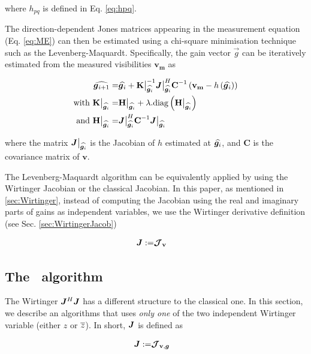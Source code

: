 \noindent where $h_{pq}$ is defined in Eq. \ref{eq:hpq}.

The direction-dependent Jones matrices appearing in the measurement
equation (Eq. \ref{eq:ME}) can then be estimated using a chi-square
minimisation technique such as the Levenberg-Maquardt. Specifically, the gain vector $\vec{g}$ can be iteratively estimated from the
measured visibilities $\mathbf{v_m}$ as

\def\SimpleJacobAtXi{\bm{J}\big|_{\widehat{\g_{i}}}}
\def\HAtXi{\H\big|_{\widehat{\g_{i}}}}
\def\KAtXi{\textbf{K}\big|_{\widehat{\g_{i}}}}
\begin{alignat}{2}
\label{eq:LM}
\widehat{\vec{g}_{i+1}}=&\widehat{\vec{g}_{i}}+\KAtXi^{-1}\SimpleJacobAtXi^H\textbf{C}^{-1}\left(\mathbf{v_m}-h\left(\widehat{\vec{g}_{i}}\right)\right)\\
\text{with }\KAtXi=&\HAtXi+\lambda.\text{diag} \left(\HAtXi\right)\\
\text{and }\HAtXi=&\SimpleJacobAtXi^H\textbf{C}^{-1}\SimpleJacobAtXi
\end{alignat}

\noindent where the matrix $\SimpleJacobAtXi$ is the Jacobian of $h$
estimated at $\widehat{\bm{g}_{i}}$, and
$\textbf{C}$ is the covariance matrix of $\mathbf{v}$.

The Levenberg-Maquardt algorithm can be equivalently applied by using the Wirtinger Jacobian
or the classical Jacobian. In this paper, as mentioned in \ref{sec:Wirtinger}, instead of computing the Jacobian using the real and
imaginary parts of gains as independent variables, we use the Wirtinger
derivative definition (see Sec. \ref{sec:WirtingerJacob})

\begin{alignat}{2}
\label{eq:LMWirtinger}
\bm{J}:=&\bm{\mathcal{J}}_{\textbf{v}}
\end{alignat}

\subsection{The \COH~algorithm}
\label{sec:COH}

The Wirtinger $\bm{J}^H\bm{J}$ has a different structure to the classical one. In this section, we describe an algorithms that uses {\it only one} of the
two independent Wirtinger variable (either $z$ or $\overline{z}$). In
short, $\bm{J}$ is defined as

\begin{alignat}{2}
\label{eq:LMWirtinger}
\bm{J}:=&\bm{\mathcal{J}}_{\textbf{v},\bm{g}}
\end{alignat}

